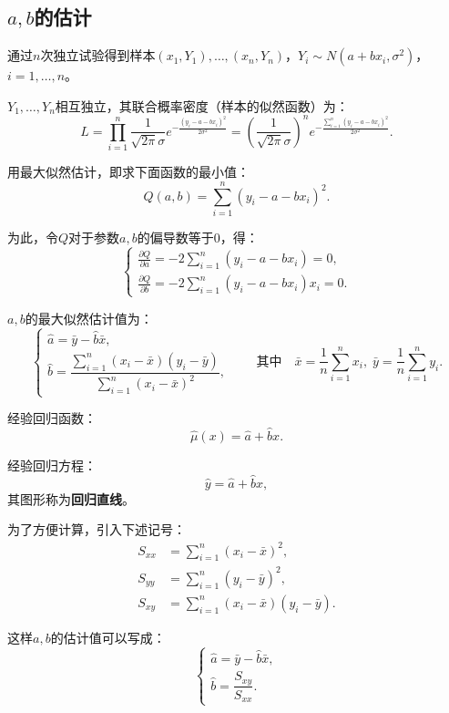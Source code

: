 \documentclass[11pt,a4paper]{report}
\theoremstyle{definition}
\begin{document}
\subsection{\texorpdfstring{$a,b$}{a,b}的估计}

通过$n$次独立试验得到样本$(x_{1},Y_{1}),\ldots,(x_{n},Y_{n})$，$Y_{i}\sim N(a+bx_{i},\sigma^{2})$，$i=1,\ldots,n$。

$Y_{1},\ldots,Y_{n}$相互独立，其联合概率密度（样本的似然函数）为：
\[
L=\prod_{i=1}^{n}\frac{1}{\sqrt{2\pi}\sigma}e^{-\frac{(y_{i}-a-bx_{i})^{2}}{2\sigma^{2}}}
=\left(\frac{1}{\sqrt{2\pi}\sigma}\right)^{n}e^{-\frac{\sum_{i=1}^{n}(y_{i}-a-bx_{i})^{2}}{2\sigma^{2}}}.
\]

用最大似然估计，即求下面函数的最小值：
\[
Q(a,b)=\sum_{i=1}^{n}(y_{i}-a-bx_{i})^{2}.
\]

为此，令$Q$对于参数$a,b$的偏导数等于0，得：
\[
\begin{cases}
\displaystyle\frac{\partial Q}{\partial a}=-2\sum_{i=1}^{n}(y_{i}-a-bx_{i})=0,\\[0.8em]
\displaystyle\frac{\partial Q}{\partial b}=-2\sum_{i=1}^{n}(y_{i}-a-bx_{i})x_{i}=0.
\end{cases}
\]

$a,b$的最大似然估计值为：
\[
\begin{cases}
\hat{a}=\bar{y}-\hat{b}\bar{x},\\[0.3em]
\hat{b}=\dfrac{\sum_{i=1}^{n}(x_{i}-\bar{x})(y_{i}-\bar{y})}{\sum_{i=1}^{n}(x_{i}-\bar{x})^{2}},
\end{cases}
\qquad\text{其中}\quad
\bar{x}=\frac{1}{n}\sum_{i=1}^{n}x_{i},\;\bar{y}=\frac{1}{n}\sum_{i=1}^{n}y_{i}.
\]

经验回归函数：
\[
\hat{\mu}(x)=\hat{a}+\hat{b}x.
\]

经验回归方程：
\[
\hat{y}=\hat{a}+\hat{b}x,
\]
其图形称为\textbf{回归直线}。

为了方便计算，引入下述记号：
\[
\begin{aligned}
S_{xx}&=\sum_{i=1}^{n}(x_{i}-\bar{x})^{2},\\
S_{yy}&=\sum_{i=1}^{n}(y_{i}-\bar{y})^{2},\\
S_{xy}&=\sum_{i=1}^{n}(x_{i}-\bar{x})(y_{i}-\bar{y}).
\end{aligned}
\]

这样$a,b$的估计值可以写成：
\[
\begin{cases}
\hat{a}=\bar{y}-\hat{b}\bar{x},\\[0.3em]
\hat{b}=\dfrac{S_{xy}}{S_{xx}}.
\end{cases}
\]
\end{document}

